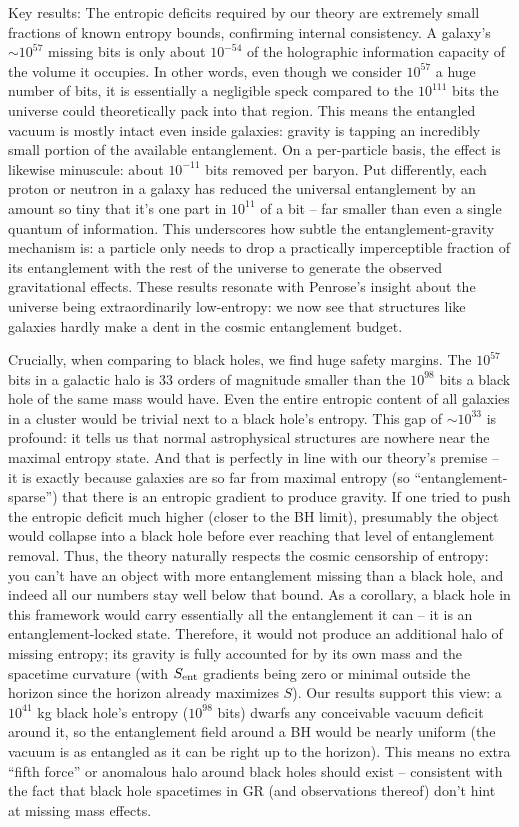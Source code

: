 \documentclass[11pt]{article}
\begin{document}
Key results: The entropic deficits required by our theory are extremely small fractions of known entropy bounds, confirming internal consistency. A galaxy’s $\sim 10^{57}$ missing bits is only about $10^{-54}$ of the holographic information capacity of the volume it occupies​. In other words, even though we consider $10^{57}$ a huge number of bits, it is essentially a negligible speck compared to the $10^{111}$ bits the universe could theoretically pack into that region. This means the entangled vacuum is mostly intact even inside galaxies: gravity is tapping an incredibly small portion of the available entanglement. On a per-particle basis, the effect is likewise minuscule: about $10^{-11}$ bits removed per baryon. Put differently, each proton or neutron in a galaxy has reduced the universal entanglement by an amount so tiny that it’s one part in $10^{11}$ of a bit – far smaller than even a single quantum of information. This underscores how subtle the entanglement-gravity mechanism is: a particle only needs to drop a practically imperceptible fraction of its entanglement with the rest of the universe to generate the observed gravitational effects. These results resonate with Penrose’s insight about the universe being extraordinarily low-entropy: we now see that structures like galaxies hardly make a dent in the cosmic entanglement budget​.

Crucially, when comparing to black holes, we find huge safety margins. The $10^{57}$ bits in a galactic halo is 33 orders of magnitude smaller than the $10^{98}$ bits a black hole of the same mass would have. Even the entire entropic content of all galaxies in a cluster would be trivial next to a black hole’s entropy. This gap of $\sim 10^{33}$ is profound: it tells us that normal astrophysical structures are nowhere near the maximal entropy state. And that is perfectly in line with our theory’s premise – it is exactly because galaxies are so far from maximal entropy (so “entanglement-sparse”) that there is an entropic gradient to produce gravity. If one tried to push the entropic deficit much higher (closer to the BH limit), presumably the object would collapse into a black hole before ever reaching that level of entanglement removal. Thus, the theory naturally respects the cosmic censorship of entropy: you can’t have an object with more entanglement missing than a black hole, and indeed all our numbers stay well below that bound. As a corollary, a black hole in this framework would carry essentially all the entanglement it can – it is an entanglement-locked state. Therefore, it would not produce an additional halo of missing entropy; its gravity is fully accounted for by its own mass and the spacetime curvature (with $S_{\rm ent}$ gradients being zero or minimal outside the horizon since the horizon already maximizes $S$). Our results support this view: a $10^{41}$ kg black hole’s entropy ($10^{98}$ bits) dwarfs any conceivable vacuum deficit around it, so the entanglement field around a BH would be nearly uniform (the vacuum is as entangled as it can be right up to the horizon). This means no extra “fifth force” or anomalous halo around black holes should exist – consistent with the fact that black hole spacetimes in GR (and observations thereof) don’t hint at missing mass effects.
\end{document}
